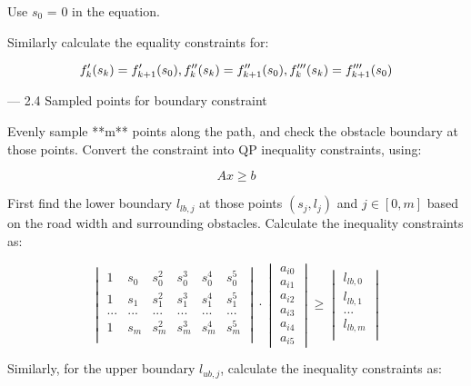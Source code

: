 \documentclass[a4paper,11pt]{article}  %
\begin{document}
Use $s_0$ = 0 in the equation.

Similarly calculate the equality constraints for: 

$$
f'_k(s_k) = f'_{k+1} (s_0), 
\\
f''_k(s_k) = f''_{k+1} (s_0), 
\\
f'''_k(s_k) = f'''_{k+1} (s_0)
$$


--- 2.4  Sampled points for boundary constraint

Evenly sample **m** points along the path, and check the obstacle boundary at those points.  Convert the constraint into QP inequality constraints, using:

$$
Ax \geq b
$$

First find the lower boundary $l_{lb,j}$ at those points $(s_j, l_j)$ and  $j\in[0, m]$ based on the road width and surrounding obstacles. Calculate the inequality constraints as:

$$
\begin{vmatrix} 
 1 & s_0 & s_0^2 & s_0^3 & s_0^4&s_0^5 \\
  1 & s_1 & s_1^2 & s_1^3 & s_1^4&s_1^5 \\
 ...&...&...&...&...&... \\
 1 & s_m & s_m^2 & s_m^3 & s_m^4&s_m^5 \\
 \end{vmatrix} \cdot \begin{vmatrix}a_{i0} \\ a_{i1} \\ a_{i2} \\ a_{i3} \\ a_{i4} \\ a_{i5}  \end{vmatrix} 
 \geq 
 \begin{vmatrix}
 l_{lb,0}\\
 l_{lb,1}\\
 ...\\
 l_{lb,m}\\
 \end{vmatrix}
$$



Similarly, for the upper boundary $l_{ub,j}$, calculate the inequality constraints as: 
\end{document}
